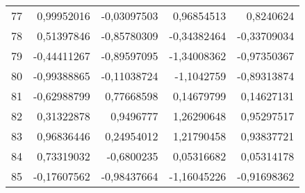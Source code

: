 \documentclass[12pt]{article}
\begin{document}
\begin{longtable}{lrrrr}
 77 & 0,99952016 & -0,03097503 & 0,96854513 &  0,8240624 \\
 78 & 0,51397846 & -0,85780309 & -0,34382464 & -0,33709034 \\
 79 & -0,44411267 & -0,89597095 & -1,34008362 & -0,97350367 \\
 80 & -0,99388865 & -0,11038724 & -1,1042759 & -0,89313874 \\
 81 & -0,62988799 & 0,77668598 & 0,14679799 & 0,14627131 \\
 82 & 0,31322878 &  0,9496777 & 1,26290648 & 0,95297517 \\
 83 & 0,96836446 & 0,24954012 & 1,21790458 & 0,93837721 \\
 84 & 0,73319032 & -0,6800235 & 0,05316682 & 0,05314178 \\
 85 & -0,17607562 & -0,98437664 & -1,16045226 & -0,91698362 \\
\end{longtable}
\end{document}
